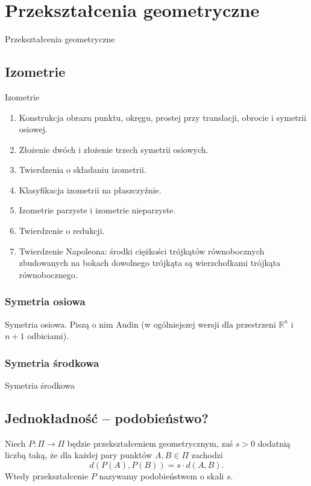 \section{Przekształcenia geometryczne}
Przekształcenia geometryczne

\subsection{Izometrie}
Izometrie

\begin{enumerate}
    \item Konstrukcja obrazu punktu, okręgu, prostej przy translacji, obrocie i symetrii osiowej.
    \item Złożenie dwóch i złożenie trzech symetrii osiowych.
    \item Twierdzenia o składaniu izometrii.
    \item Klasyfikacja izometrii na płaszczyźnie.
    \item Izometrie parzyste i izometrie nieparzyste.
    \item Twierdzenie o redukcji.
    \item Twierdzenie Napoleona: środki ciężkości trójkątów równobocznych zbudowanych na bokach dowolnego trójkąta są wierzchołkami trójkąta równobocznego.
\end{enumerate}

\subsubsection{Symetria osiowa}
Symetria osiowa.
Piszą o nim Audin \cite[s. 49]{audin_2003} (w ogólniejszej wersji dla przestrzeni $\mathbb R^n$ i $n+1$ odbiciami).


\subsubsection{Symetria środkowa}
Symetria środkowa

\subsection{Jednokładność -- podobieństwo?}

\begin{definition}[podobieństwo]
    Niech $P \colon \Pi \to \Pi$ będzie przekształceniem geometrycznym, zaś $s > 0$ dodatnią liczbą taką, że dla każdej pary punktów $A, B \in \Pi$ zachodzi
    \begin{equation}
        d(P(A), P(B)) = s \cdot d(A, B).
    \end{equation}
    Wtedy przekształcenie $P$ nazywamy podobieństwem o skali $s$.
\end{definition}

